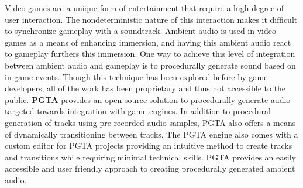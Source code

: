 
Video games are a unique form of entertainment that require a high degree of user interaction. The nondeterministic 
nature of this interaction makes it difficult to synchronize gameplay with a soundtrack. Ambient audio is used in video games as a
means of enhancing immersion, and having this ambient audio react to gameplay furthers this immersion. One way to achieve
this level of integration between ambient audio and gameplay is to procedurally generate sound based on in-game events.
Though this technique has been explored before
by game developers, all of the work has been proprietary and thus not accessible to the public. \textbf{PGTA} provides 
an open-source solution to procedurally generate audio targeted towards integration with game engines. In addition to 
procedural generation of tracks using pre-recorded audio samples, PGTA also offers a means of dynamically 
transitioning between tracks. The PGTA engine also comes with a custom editor for PGTA projects providing an intuitive method
to create tracks and transitions while requiring minimal technical skills. PGTA provides an easily accessible and user friendly
approach to creating procedurally generated ambient audio. 

